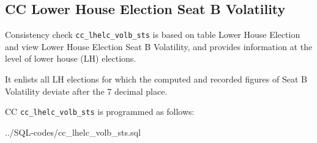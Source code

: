 \subsection{CC Lower House Election Seat B Volatility}\label{cc_lhelc_volb_sts}
Consistency check \texttt{\footnotesize cc\_lhelc\_volb\_sts} is based on table Lower House Election and view Lower House Election Seat B Volatility, and provides information at the level of lower house (LH) elections.

It enlists all LH elections for which the computed and recorded figures of Seat B Volatility deviate after the 7  decimal place.

CC \texttt{\footnotesize cc\_lhelc\_volb\_sts} is programmed as follows:

%
{../SQL-codes/cc_lhelc_volb_sts.sql}


